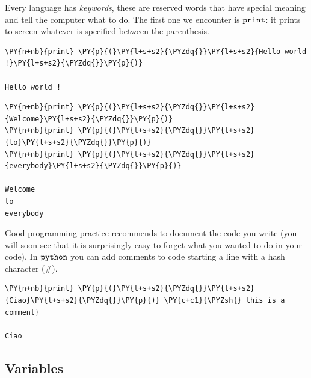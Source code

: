 Every language has \emph{keywords}, these are reserved words that have special meaning and tell the computer what to do. The first one we encounter is \(\tt{print}\): it prints to screen whatever is specified between the parenthesis.

\begin{codebox}[breakable, size=fbox, boxrule=1pt, pad at break*=1mm, colback=cellbackground, colframe=cellborder]
\begin{Verbatim}[commandchars=\\\{\}]
\PY{n+nb}{print} \PY{p}{(}\PY{l+s+s2}{\PYZdq{}}\PY{l+s+s2}{Hello world !}\PY{l+s+s2}{\PYZdq{}}\PY{p}{)} 

Hello world !
\end{Verbatim}
\end{codebox}

\begin{codebox}[breakable, size=fbox, boxrule=1pt, pad at break*=1mm, colback=cellbackground, colframe=cellborder]
\begin{Verbatim}[commandchars=\\\{\}]
\PY{n+nb}{print} \PY{p}{(}\PY{l+s+s2}{\PYZdq{}}\PY{l+s+s2}{Welcome}\PY{l+s+s2}{\PYZdq{}}\PY{p}{)}
\PY{n+nb}{print} \PY{p}{(}\PY{l+s+s2}{\PYZdq{}}\PY{l+s+s2}{to}\PY{l+s+s2}{\PYZdq{}}\PY{p}{)}
\PY{n+nb}{print} \PY{p}{(}\PY{l+s+s2}{\PYZdq{}}\PY{l+s+s2}{everybody}\PY{l+s+s2}{\PYZdq{}}\PY{p}{)}

Welcome
to
everybody
\end{Verbatim}
\end{codebox}

Good programming practice recommends to document the code you write (you will soon see that it is surprisingly easy to forget what you wanted to do in your code). In \(\tt{python}\) you can add comments to code starting a line with a hash character (\#).

\begin{codebox}[breakable, size=fbox, boxrule=1pt, pad at break*=1mm, colback=cellbackground, colframe=cellborder]
\begin{Verbatim}[commandchars=\\\{\}]
\PY{n+nb}{print} \PY{p}{(}\PY{l+s+s2}{\PYZdq{}}\PY{l+s+s2}{Ciao}\PY{l+s+s2}{\PYZdq{}}\PY{p}{)} \PY{c+c1}{\PYZsh{} this is a comment}

Ciao
\end{Verbatim}
\end{codebox}

\subsection{Variables}\label{variables}

